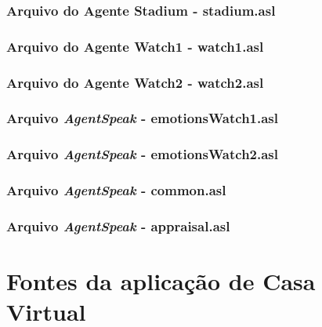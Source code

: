 \subsection*{Arquivo do Agente Stadium - stadium.asl}


%
%
\subsection*{Arquivo do Agente Watch1 - watch1.asl}


\subsection*{Arquivo do Agente Watch2 - watch2.asl}


\subsection*{Arquivo \emph{AgentSpeak} - emotionsWatch1.asl}


\subsection*{Arquivo \emph{AgentSpeak} - emotionsWatch2.asl}


\subsection*{Arquivo \emph{AgentSpeak} - common.asl}


\subsection*{Arquivo \emph{AgentSpeak} - appraisal.asl}



\chapter{Fontes da aplicação de Casa Virtual}

